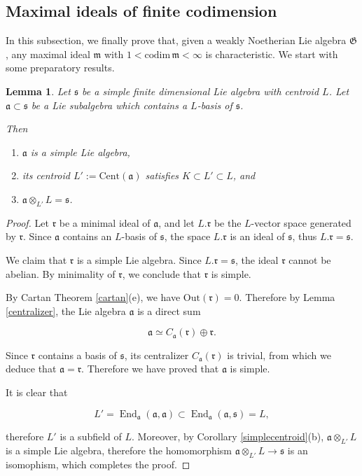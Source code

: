 \documentclass[11pt, letterpaper, reqno]{amsart}
\newtheorem{lemma}[theorem]{Lemma}
\theoremstyle{definition}
\newcommand{\End}{\operatorname{End}}
\newcommand{\fa}{\mathfrak{a}}
\newcommand{\fm}{\mathfrak{m}}
\newcommand{\fr}{\mathfrak{r}}
\newcommand{\fs}{\mathfrak{s}}
\newcommand{\fG}{\mathfrak{G}}
\newcommand{\Cent}{\mathrm{Cent}}
\newcommand{\codim}{\mathrm{codim}}
\newcommand{\Out}{\mathrm{Out}}
\begin{document}
\subsection{Maximal ideals of finite codimension}

In this subsection, we  finally  prove that, given a weakly
Noetherian Lie algebra $\fG$,
 any maximal ideal $\fm$ with
 $1<\codim\, \fm<\infty $ is characteristic.
 We start with some preparatory results.




\begin{lemma}\label{cartancor2} Let $\fs$ be a simple  finite dimensional Lie algebra with centroid $L$.
Let $\fa\subset\fs$ be a Lie subalgebra which contains a $L$-basis of $\fs$.

Then  

\begin{enumerate}
\item[(a)] $\fa$ is a simple Lie algebra,
\item[(b)] its centroid $L':=\Cent(\fa)$ satisfies
$K\subset L'\subset L$, and
\item[(c)] $\fa \otimes_{L'}L=\fs$.
\end{enumerate}
\end{lemma}

\begin{proof} Let $\fr$ be a minimal ideal
of $\fa$, and let $L.\fr$ be the $L$-vector space generated by $\fr$. Since $\fa$ contains an $L$-basis of $\fs$, the space $L.\fr$ is an
ideal of $\fs$, thus $L.\fr=\fs$. 

We claim that $\fr$ is a simple Lie algebra.  
Since $L.\fr=\fs$, the ideal $\fr$ cannot be abelian.
By minimality of $\fr$, we conclude that $\fr$ is simple.

By Cartan Theorem \ref{cartan}(e), we have $\Out(\fr)=0$.
Therefore by Lemma \ref{centralizer}, the Lie algebra
$\fa$ is a direct sum

$$\fa\simeq C_\fa(\fr)\oplus \fr.$$

\noindent Since $\fr$ contains a basis of $\fs$, its centralizer
$C_\fa(\fr)$ is trivial, from which we deduce that
$\fa=\fr$. Therefore we have proved that $\fa$ is simple.

It is clear that 

$$L'=\End_\fa(\fa,\fa)\subset \End_\fa(\fa,\fs)=L,$$

\noindent therefore $L'$ is a subfield of $L$. Moreover,
by Corollary \ref{simplecentroid}(b), $\fa\otimes_{L'} L$ is a simple Lie algebra, therefore the homomorphism
$\fa\otimes_{L'} L\to \fs$ is an isomophism, which completes the proof.
\end{proof}
\end{document}
